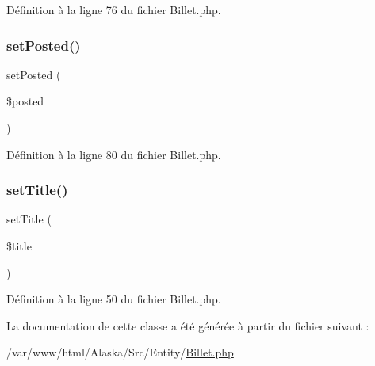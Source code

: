 Définition à la ligne 76 du fichier Billet.\+php.

\mbox{\label{class_src_1_1_entity_1_1_billet_acee4aedcde0f95ac298a1a0ce86be082}} 
\subsubsection{\texorpdfstring{set\+Posted()}{setPosted()}}
{\footnotesize\ttfamily set\+Posted (\begin{DoxyParamCaption}\item[{}]{\$posted }\end{DoxyParamCaption})}



Définition à la ligne 80 du fichier Billet.\+php.

\mbox{\label{class_src_1_1_entity_1_1_billet_a884ba9bb0d54bde7839e798db7964476}} 
\subsubsection{\texorpdfstring{set\+Title()}{setTitle()}}
{\footnotesize\ttfamily set\+Title (\begin{DoxyParamCaption}\item[{}]{\$title }\end{DoxyParamCaption})}



Définition à la ligne 50 du fichier Billet.\+php.



La documentation de cette classe a été générée à partir du fichier suivant \+:\begin{DoxyCompactItemize}
\item 
/var/www/html/\+Alaska/\+Src/\+Entity/\hyperlink{_billet_8php}{Billet.\+php}\end{DoxyCompactItemize}
